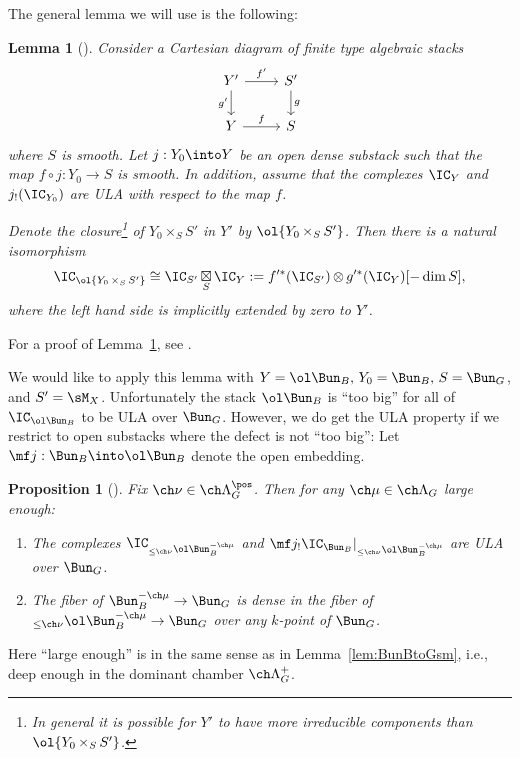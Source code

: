 \documentclass[final]{amsart}
\newtheorem{lem}[subsubsection]{Lemma}
\newtheorem{prop}[subsubsection]{Proposition}
\theoremstyle{remark}
\theoremstyle{definition}
\DeclareMathOperator*{\ot}{\otimes}
\DeclareMathOperator*{\xt}{\times}
\DeclareMathOperator*{\bt}{\boxtimes}
\numberwithin{equation}{section}
\begin{document}
The general lemma we will use is the following:

\begin{lem}[{\cite[Lemma 7.1.3]{BG}}] \label{lem:ULAbox} 
Consider a Cartesian diagram of finite type algebraic stacks
\[
\begin{tikzcd} 
Y' \ar[r, "{f'}"] \ar[d, "{g'}", swap] & S' \ar[d, "g"] \\ 
Y \ar[r, "f"] & S
\end{tikzcd}
\]
where $S$ is smooth.
Let $j : Y_0 \into Y$ be an open dense substack such that
the map $f \circ j : Y_0 \to S$ is smooth. 
In addition, assume that the complexes $\IC_Y$ and $j_!(\IC_{Y_0})$
are ULA with respect to the map $f$. 

Denote the closure\footnote{In general it is possible for $Y'$ to have more irreducible
components than $\ol{Y_0\xt_{S} S'}$.} 
of $Y_0 \xt_S S'$ in $Y'$ by $\ol{Y_0 \xt_S S'}$. 
Then there is a natural isomorphism 
\[ 
\IC_{\ol{Y_0 \xt_S S'}} \cong \IC_{S'}\bt_S \IC_{Y}  := 
f'^*(\IC_{S'})\ot g'^*(\IC_Y) [-\dim S],
\]
where the left hand side is implicitly extended by zero to $Y'$.
\end{lem}
For a proof of Lemma~\ref{lem:ULAbox}, see \cite{Wang:ULA}.

\medskip

We would like to apply this lemma with $Y = \ol\Bun_B, \, Y_0 = \Bun_B,\,
S = \Bun_G$, and $S' = \sM_X$. Unfortunately the stack $\ol\Bun_B$ is
``too big'' for all of $\IC_{\ol\Bun_B}$ to be ULA over $\Bun_G$. 
However, we do get the ULA property if we restrict to open substacks
where the defect is not ``too big'':
Let $\mf j : \Bun_B \into \ol\Bun_B$ denote the open embedding.

\begin{prop}[{\cite{Campbell, Campbell2}}]
\label{prop:ULA}
Fix $\ch\nu \in \ch\Lambda^\pos_G$. Then for any $\ch\mu \in \ch\Lambda_G$
large enough:
\begin{enumerate}
\item The complexes $\IC_{_{\le \ch\nu}\ol\Bun^{-\ch\mu}_B}$ and 
$\mf j_! \IC_{\Bun_B}|_{_{\le \ch\nu}\ol\Bun^{-\ch\mu}_B}$ are 
ULA over $\Bun_G$.
\item The fiber of $\Bun^{-\ch\mu}_B \to \Bun_G$ is dense in the
fiber of $_{\le\ch\nu}\ol\Bun^{-\ch\mu}_B \to \Bun_G$ over any $k$-point of $\Bun_G$.
\end{enumerate}
\end{prop}

Here ``large enough'' is in the same sense as in Lemma~\ref{lem:BunBtoGsm}, i.e.,
deep enough in the dominant chamber $\ch\Lambda^+_G$.
\end{document}
